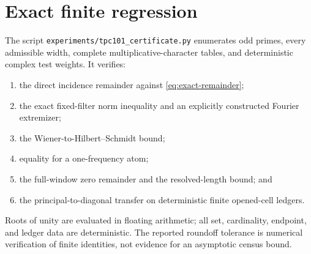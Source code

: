 \section{Exact finite regression}
\label{sec:regression}

The script
\texttt{experiments/tpc101\_certificate.py} enumerates odd primes,
every admissible width, complete multiplicative-character tables,
and deterministic complex test weights.  It verifies:
\begin{enumerate}[leftmargin=2em]
\item the direct incidence remainder against
  \eqref{eq:exact-remainder};
\item the exact fixed-filter norm inequality and an explicitly
  constructed Fourier extremizer;
\item the Wiener-to-Hilbert--Schmidt bound;
\item equality for a one-frequency atom;
\item the full-window zero remainder and the resolved-length bound;
  and
\item the principal-to-diagonal transfer on deterministic finite
  opened-cell ledgers.
\end{enumerate}
Roots of unity are evaluated in floating arithmetic; all set,
cardinality, endpoint, and ledger data are deterministic.  The
reported roundoff tolerance is numerical verification of finite
identities, not evidence for an asymptotic census bound.
